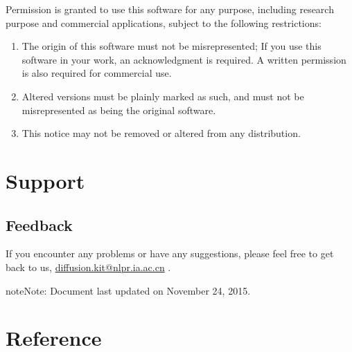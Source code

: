 \documentclass[letterpaper,10pt,english]{sphinxmanual}
\begin{document}
Permission is granted to use this software for any purpose,
including research purpose and commercial applications, subject to the following restrictions:
\begin{enumerate}
\item {} 
The origin of this software must not be misrepresented; If you use this software in your work, an acknowledgment is required. A written permission is also required for commercial use.

\item {} 
Altered versions must be plainly marked as such, and must not be misrepresented as being the original software.

\item {} 
This notice may not be removed or altered from any distribution.

\end{enumerate}


\section{Support}
\label{feedback:support}\label{feedback::doc}

\subsection{Feedback}
\label{feedback:feedback}
If you encounter any problems or have any suggestions,
please feel free to get back to us, \href{mailto:diffusion.kit@nlpr.ia.ac.cn}{diffusion.kit@nlpr.ia.ac.cn} .

\begin{notice}{note}{Note:}
Document last updated on November 24, 2015.
\end{notice}


\section{Reference}
\label{index:reference}


\renewcommand{\indexname}{Index}
\printindex
\end{document}
